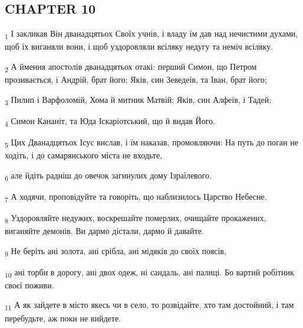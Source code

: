 \subsection{CHAPTER 10}
\begin{tcolorbox}
\textsubscript{1} І закликав Він дванадцятьох Своїх учнів, і владу їм дав над нечистими духами, щоб їх виганяли вони, і щоб уздоровляли всіляку недугу та неміч всіляку.
\end{tcolorbox}
\begin{tcolorbox}
\textsubscript{2} А ймення апостолів дванадцятьох отакі: перший Симон, що Петром прозивається, і Андрій, брат його; Яків, син Зеведеїв, та Іван, брат його;
\end{tcolorbox}
\begin{tcolorbox}
\textsubscript{3} Пилип і Варфоломій, Хома й митник Матвій; Яків, син Алфеїв, і Тадей;
\end{tcolorbox}
\begin{tcolorbox}
\textsubscript{4} Симон Кананіт, та Юда Іскаріотський, що й видав Його.
\end{tcolorbox}
\begin{tcolorbox}
\textsubscript{5} Цих Дванадцятьох Ісус вислав, і їм наказав, промовляючи: На путь до поган не ходіть, і до самарянського міста не входьте,
\end{tcolorbox}
\begin{tcolorbox}
\textsubscript{6} але йдіть радніш до овечок загинулих дому Ізраїлевого.
\end{tcolorbox}
\begin{tcolorbox}
\textsubscript{7} А ходячи, проповідуйте та говоріть, що наблизилось Царство Небесне.
\end{tcolorbox}
\begin{tcolorbox}
\textsubscript{8} Уздоровляйте недужих, воскрешайте померлих, очищайте прокажених, виганяйте демонів. Ви дармо дістали, дармо й давайте.
\end{tcolorbox}
\begin{tcolorbox}
\textsubscript{9} Не беріть ані золота, ані срібла, ані мідяків до своїх поясів,
\end{tcolorbox}
\begin{tcolorbox}
\textsubscript{10} ані торби в дорогу, ані двох одеж, ні сандаль, ані палиці. Бо вартий робітник своєї поживи.
\end{tcolorbox}
\begin{tcolorbox}
\textsubscript{11} А як зайдете в місто якесь чи в село, то розвідайте, хто там достойний, і там перебудьте, аж поки не вийдете.
\end{tcolorbox}
